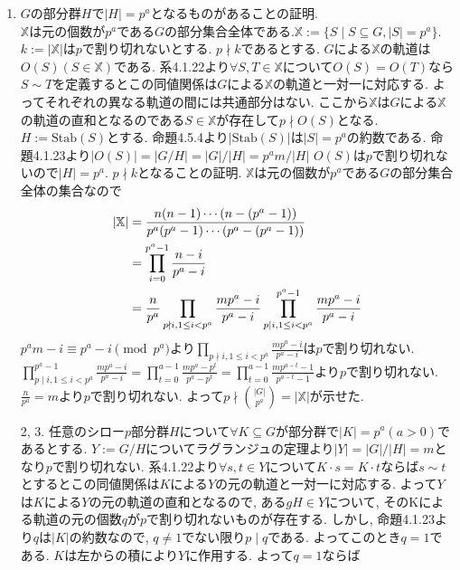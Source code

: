 \documentclass[dvipdfmx]{jsarticle}
\theoremstyle{definition}
\numberwithin{equation}{section}
\numberwithin{props}{section}
\numberwithin{definition}{section}
\numberwithin{note}{section}
\newcommand{\XX}{\mathbb{X}}
\newcommand{\Stab}{\mathrm{Stab}}
\begin{document}
\begin{enumerate}
     \item $G$の部分群$H$で$\lvert H\rvert=p^a$となるものがあることの証明.\\
           $\XX$は元の個数が$p^a$である$G$の部分集合全体である.$\XX:=\lbrace S\mid S\subseteq G,\lvert S\rvert=p^a\rbrace$.
           $k := \lvert \XX\rvert$は$p$で割り切れないとする. $p\nmid k$であるとする.
           $G$による$\XX$の軌道は$O(S)(S\in \XX)$である. 系4.1.22より$\forall S,T\in \XX$について$O(S)=O(T)$なら$S\sim T$を定義するとこの同値関係は$G$による$\XX$の軌道と一対一に対応する.
           よってそれぞれの異なる軌道の間には共通部分はない. ここから$\XX$は$G$による$\XX$の軌道の直和となるのである$S\in \XX$が存在して$p\nmid O(S)$となる.
           $H:=\Stab(S)$とする. 命題4.5.4より$\lvert \Stab(S)\rvert$は$\lvert S\rvert=p^a$の約数である.
           命題4.1.23より$\lvert O(S)\rvert=\lvert G/H\rvert=\lvert G\rvert/\lvert H\rvert = p^am/\lvert H\rvert$ $O(S)$は$p$で割り切れないので$\lvert H\rvert=p^a$.
           $p\nmid k$となることの証明.
           $\XX$は元の個数が$p^a$である$G$の部分集合全体の集合なので
           \begin{align}
                \lvert\XX\rvert & = \frac{n(n-1)\cdots(n-(p^a-1))}{p^a(p^a-1)\cdots (p^a - (p^a - 1))}\cr
                                & = \prod_{i=0}^{p^a-1} \frac{n-i}{p^a-i}                                                                                 \\
                                & =\frac{n}{p^a}\prod_{p\nmid i,1\leq i<p^a} \frac{mp^a-i}{p^a-i}\prod_{p\mid i,1\leq i<p^a}^{p^a-1} \frac{mp^a-i}{p^a-i} \\
           \end{align}
           $p^am - i \equiv p^a - i\pmod {p^a}$より$\prod_{p\nmid i,1\leq i<p^a} \frac{mp^a-i}{p^a-i}$は$p$で割り切れない.
           $\prod_{p\mid i,1\leq i<p^a}^{p^a-1} \frac{mp^a-i}{p^a-i}=\prod_{t=0}^{a-1} \frac{mp^a-p^t}{p^a-p^t}=\prod_{t=0}^{a-1} \frac{mp^{a-t}-1}{p^{a-t}-1}$より$p$で割り切れない.
           $\frac{n}{p^a}=m$より$p$で割り切れない.
           よって$p\nmid \binom{\lvert G\rvert}{p^a}=\lvert\XX\rvert$が示せた.
     \item[2, 3.] 任意のシロー$p$部分群$H$について$\forall K\subseteq G$が部分群で$\lvert K\rvert=p^a (a>0)$であるとする. $Y:= G/H$についてラグランジュの定理より$\lvert Y\rvert = \lvert G\rvert/\lvert H\rvert=m$となり$p$で割り切れない. 系4.1.22より$\forall s,t \in Y$について$K\cdot s=K\cdot t$ならば$s\sim t$とするとこの同値関係は$K$による$Y$の元の軌道と一対一に対応する. よって$Y$は$K$による$Y$の元の軌道の直和となるので, ある$gH\in Y$について, そのKによる軌道の元の個数$q$が$p$で割り切れないものが存在する. しかし, 命題4.1.23より$q$は$\lvert K\rvert$の約数なので, $q\neq 1$でない限り$p\mid q$である. よってこのとき$q=1$である. $K$は左からの積により$Y$に作用する. よって$q=1$ならば

\end{enumerate}
\end{document}
